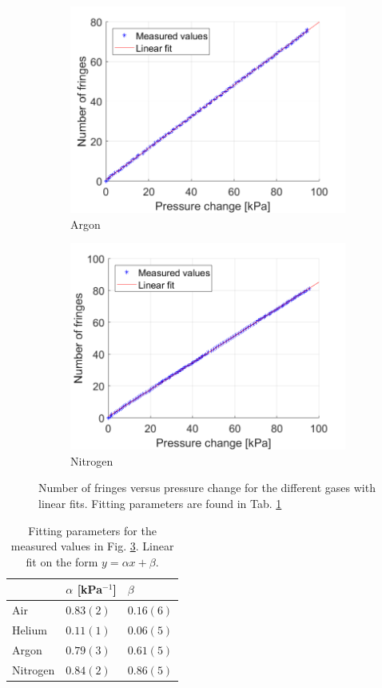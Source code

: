 \begin{figure}[H]
\begin{subfigure}{0.49\textwidth}
    \includegraphics[width=\textwidth]{matlab/Argon}
    \caption{Argon}
    \label{fig:Argon}
  \end{subfigure}
  \begin{subfigure}{0.49\textwidth}
    \includegraphics[width=\textwidth]{matlab/Nitrogen}
    \caption{Nitrogen}
    \label{fig:Nitrogen}
  \end{subfigure}
  \caption{Number of fringes versus pressure change for the different gases with linear fits. Fitting parameters are found in Tab. \ref{tab:linearFits}}
  \label{fig:measurements}
\end{figure}

\begin{table}[H]
  \centering
  \caption{Fitting parameters for the measured values in Fig. \ref{fig:measurements}. Linear fit on the form $y=\alpha x + \beta$.}
  \label{tab:linearFits}
  \begin{tabular}{l|l|l}
           & $\alpha$ [kPa$^{-1}$]& $\beta$ \\ \hline
  Air      & $0.83(2)$  & $0.16(6)$ \\
  Helium   & $0.11(1)$ & $0.06(5)$ \\
  Argon    & $0.79(3)$ & $0.61(5)$ \\
  Nitrogen & $0.84(2)$ & $0.86(5)$
  \end{tabular}
\end{table}

